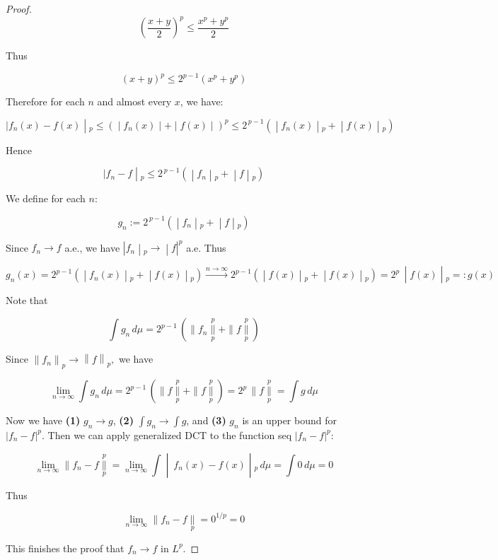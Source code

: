 \documentclass{qlnotes-export}
\begin{document}
\begin{proof}
\[(\frac{x + y}{2})^{p} \leq \frac{x^{p} + y^{p}}{2}\]

Thus

\[(x + y)^{p} \leq 2^{p - 1}(x^{p} + y^{p})\]

Therefore for each \(n\) and almost every \(x\), we have:

\[\left. |f_{n}(x) - f(x) \middle| {}_{p} \leq ( \middle| f_{n}(x) \middle| + \middle| f(x) \middle| )^{p} \leq 2^{\, p - 1}( \middle| f_{n}(x) \middle| {}_{p} + \middle| f(x) \middle| {}_{p}) \right.\]

Hence

\[\left. |f_{n} - f \middle| {}_{p} \leq 2^{\, p - 1}( \middle| f_{n} \middle| {}_{p} + \middle| f \middle| {}_{p}) \right.\]

We define for each \(n\):

\[\left. g_{n} := 2^{\, p - 1}( \middle| f_{n} \middle| {}_{p} + \middle| f \middle| {}_{p}) \right.\]

Since \(f_{n}\rightarrow f\) a.e., we have \(\left. |f_{n} \middle| {}_{p}\rightarrow \middle| f|^{p} \right.\) a.e. Thus

\[\left. g_{n}(x) = 2^{p - 1}( \middle| f_{n}(x) \middle| {}_{p} + \middle| f(x) \middle| {}_{p})\overset{n\rightarrow\infty}{\rightarrow}2^{p - 1}( \middle| f(x) \middle| {}_{p} + \middle| f(x) \middle| {}_{p}) = 2^{p}\, \middle| f(x) \middle| {}_{p} = :g(x) \right.\]

Note that

\[\int g_{n}\, d\mu = 2^{p - 1}\,( \parallel f_{n}\underset{p}{\overset{p}{\parallel}} + \parallel f\underset{p}{\overset{p}{\parallel}})\]

Since \(\left\| f_{n} \right\|_{p}\rightarrow\left\| f \right\|_{p},\) we have

\[\lim\limits_{n\rightarrow\infty}\int g_{n}\, d\mu = 2^{p - 1}\,( \parallel f\underset{p}{\overset{p}{\parallel}} + \parallel f\underset{p}{\overset{p}{\parallel}}) = 2^{p}\, \parallel f\underset{p}{\overset{p}{\parallel}} = \int g\, d\mu\]

Now we have \textbf{(1)} \(g_{n}\rightarrow g\), \textbf{(2)} \(\int g_{n}\rightarrow\int g\), and \textbf{(3)} \(g_{n}\) is an upper bound for \(|f_{n} - f|^{p}\). Then we can apply generalized DCT to the function seq \(|f_{n} - f|^{p}\):

\[\left. \lim\limits_{n\rightarrow\infty} \parallel f_{n} - f\underset{p}{\overset{p}{\parallel}} = \lim\limits_{n\rightarrow\infty}\int \middle| \ f_{n}(x) - f(x) \middle| {}_{p}\, d\mu = \int 0\, d\mu = 0 \right.\]

Thus

\[\lim\limits_{n\rightarrow\infty} \parallel f_{n} - f\underset{p}{\parallel} = 0^{1/p} = 0\]

This finishes the proof that \(f_{n}\rightarrow f\) in \(L^{p}\).

\end{proof}
\end{document}
